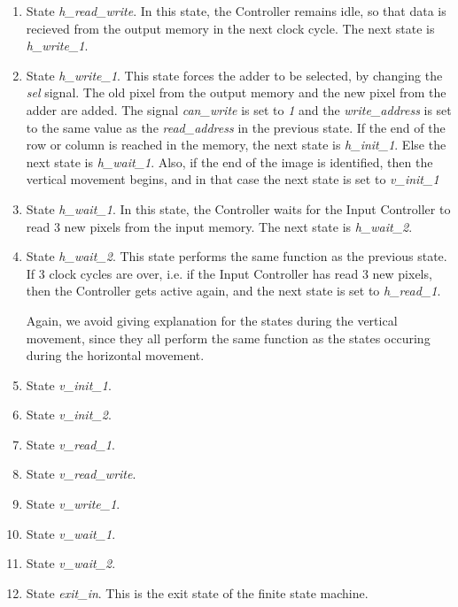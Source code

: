 \documentclass[11pt,a4paper]{article}
\begin{document}
\begin{enumerate}
\item State \textit{h\_read\_write}. In this state, the Controller remains idle, so that data is recieved from the output memory in the next clock cycle. The next state is \textit{h\_write\_1}. 

\item State \textit{h\_write\_1}. This state forces the adder to be selected, by changing the \textit{sel} signal. The old pixel from the output memory and the new pixel from the adder are added. The signal \textit{can\_write} is set to \textit{1} and the \textit{write\_address} is set to the same value as the \textit{read\_address} in the previous state. If the end of the row or column is reached in the memory, the next state is \textit{h\_init\_1}. Else the next state is \textit{h\_wait\_1}. Also, if the end of the image is identified, then the vertical movement begins, and in that case the next state is set to \textit{v\_init\_1}

\item State \textit{h\_wait\_1}. In this state, the Controller waits for the Input Controller to read 3 new pixels from the input memory. The next state is \textit{h\_wait\_2}.

\item State \textit{h\_wait\_2}. This state performs the same function as the previous state. If 3 clock cycles are over, i.e. if the Input Controller has read 3 new pixels, then the Controller gets active again, and the next state is set to \textit{h\_read\_1}.

Again, we avoid giving explanation for the states during the vertical movement, since they all perform the same function as the states occuring during the horizontal movement.
\item State \textit{v\_init\_1}. 

\item State \textit{v\_init\_2}. 

\item State \textit{v\_read\_1}. 

\item State \textit{v\_read\_write}. 

\item State \textit{v\_write\_1}. 

\item State \textit{v\_wait\_1}. 

\item State \textit{v\_wait\_2}.

\item State \textit{exit\_in}. This is the exit state of the finite state machine.

\end{enumerate}
\end{document}
